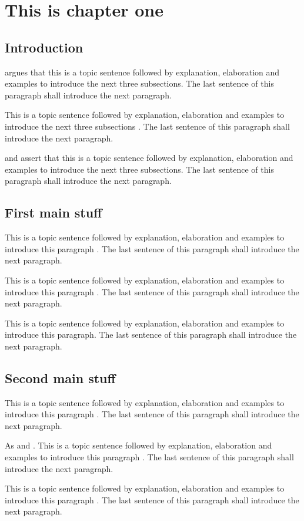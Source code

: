 \chapter{This is chapter one}
\label{ch:name4}
\section{Introduction}
\label{sec:ch_4_introduction}

\citet{Berg2016} argues that this is a topic sentence followed by explanation, elaboration and examples to introduce the next three subsections. The last sentence of this paragraph shall introduce the next paragraph.

This is a topic sentence followed by explanation, elaboration and examples to introduce the next three subsections \citep{Collins2016}. The last sentence of this paragraph shall introduce the next paragraph.

\citet{Graham2016} and \citet{Grant2016} assert that this is a topic sentence followed by explanation, elaboration and examples to introduce the next three subsections. The last sentence of this paragraph shall introduce the next paragraph.

\section{First main stuff}
\label{sec:ch_4_firstmain}

This is a topic sentence followed by explanation, elaboration and examples to introduce this paragraph \citep{Haney2016}. The last sentence of this paragraph shall introduce the next paragraph.

This is a topic sentence followed by explanation, elaboration and examples to introduce this paragraph \citep{Jordan2016,Morgan2016}. The last sentence of this paragraph shall introduce the next paragraph.

This is a topic sentence followed by explanation, elaboration and examples to introduce this paragraph. The last sentence of this paragraph shall introduce the next paragraph.

\section{Second main stuff}
\label{sec:ch_4_secondmain}

This is a topic sentence followed by explanation, elaboration and examples to introduce this paragraph \citep{Scott2016}. The last sentence of this paragraph shall introduce the next paragraph.
 
As \citet{Wells2016} and \citet{Williamson2016}.
This is a topic sentence followed by explanation, elaboration and examples to introduce this paragraph \citep{Stewart2016}. The last sentence of this paragraph shall introduce the next paragraph.

This is a topic sentence followed by explanation, elaboration and examples to introduce this paragraph \citep{Gallagher2016}. The last sentence of this paragraph shall introduce the next paragraph.
